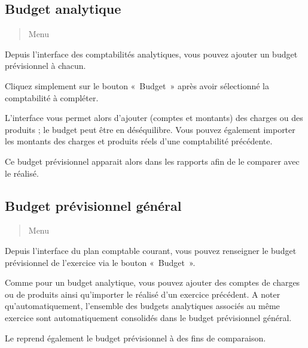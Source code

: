 \documentclass[a4paper,10pt,oneside,french]{sphinxmanual}
\begin{document}
\subsection{Budget analytique}
\label{\detokenize{accounting/budget:budget-analytique}}\begin{quote}

\sphinxAtStartPar
Menu 
\end{quote}

\sphinxAtStartPar
Depuis l’interface des comptabilités analytiques, vous pouvez ajouter un budget prévisionnel à chacun.

\sphinxAtStartPar
Cliquez simplement sur le bouton « Budget » après avoir sélectionné la comptabilité à compléter.

\sphinxAtStartPar
L’interface vous permet alors d’ajouter (comptes et montants) des charges ou des produits ; le budget peut être en déséquilibre.
Vous pouvez également importer les montants des charges et produits réels d’une comptabilité précédente.

\sphinxAtStartPar
Ce budget prévisionnel apparait alors dans les rapports afin de le comparer avec le réalisé.


\subsection{Budget prévisionnel général}
\label{\detokenize{accounting/budget:budget-previsionnel-general}}\begin{quote}

\sphinxAtStartPar
Menu 
\end{quote}

\sphinxAtStartPar
Depuis l’interface du plan comptable courant, vous pouvez renseigner le budget prévisionnel de l’exercice via le bouton « Budget ».

\sphinxAtStartPar
Comme pour un budget analytique, vous pouvez ajouter des comptes de charges ou de produits ainsi qu’importer le réalisé d’un exercice précédent.
A noter qu’automatiquement, l’ensemble des budgets analytiques associés au même exercice sont automatiquement consolidés dans le budget prévisionnel général.

\sphinxAtStartPar
Le  reprend également le budget prévisionnel à des fins de comparaison.

\sphinxstepscope
\end{document}
